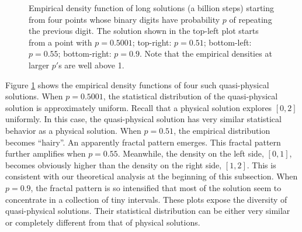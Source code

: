 \begin{figure}[H]
\caption{Empirical density function of long solutions (a billion steps)
starting from four points whose binary digits have probability $p$ of
repeating the previous digit.
The solution shown in the top-left plot starts from a point with $p=0.5001$;
top-right: $p=0.51$; bottom-left: $p=0.55$; bottom-right: $p=0.9$.
Note that the empirical densities at larger $p'$s are well above 1.}
\label{fig:tent_quasiphysical}
\end{figure}

Figure \ref{fig:tent_quasiphysical} shows the empirical density functions of
four such quasi-physical solutions.  When $p=0.5001$,
the statistical distribution of the quasi-physical solution
is approximately uniform.  Recall that a physical solution explores $[0,2]$
uniformly.  In this case, the quasi-physical solution has very similar
statistical behavior as a physical solution.  When $p=0.51$, the empirical
distribution becomes ``hairy''.  An apparently fractal pattern emerges.
This fractal pattern further amplifies when $p=0.55$.  Meanwhile,
the density on the left side, $[0,1]$, becomes obviously higher than
the density on the right side, $[1,2]$.  This is consistent with our
theoretical analysis at the beginning of this subsection.
When $p=0.9$, the fractal pattern is so intensified that most
of the solution seem to concentrate in a collection of tiny intervals.
These plots expose the diversity of quasi-physical solutions.
Their statistical distribution can be either
very similar or completely different from that of physical solutions.

